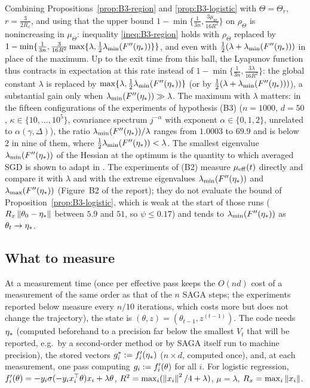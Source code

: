 Combining Propositions~\ref{prop:B3-region} and \ref{prop:B3-logistic} with $\Theta=\Theta_r$, $r=\frac{3}{2R_x}$, and using that the upper bound $1-\min\{\frac1{3n},\frac{3\mu_\Theta}{16R^2}\}$ on $\rho_\Theta$ is nonincreasing in $\mu_\Theta$: inequality \eqref{ineq:B3-region} holds with $\rho_\Theta$ replaced by $1-\min\{\frac1{3n},\frac{3}{16R^2}\max\{\lambda,\frac12\lambda_{\min}(F''(\eta_\ast))\}\}$, and even with $\frac12(\lambda+\lambda_{\min}(F''(\eta_\ast)))$ in place of the maximum. Up to the exit time from this ball, the Lyapunov function thus contracts in expectation at this rate instead of $1-\min\{\frac1{3n},\frac{3\lambda}{16R^2}\}$: the global constant $\lambda$ is replaced by $\max\{\lambda,\frac12\lambda_{\min}(F''(\eta_\ast))\}$ (or by $\frac12(\lambda+\lambda_{\min}(F''(\eta_\ast)))$), a substantial gain only when $\lambda_{\min}(F''(\eta_\ast))\gg\lambda$. The maximum with $\lambda$ matters: in the fifteen configurations of the experiments of hypothesis (B3) ($n=1000$, $d=50$, $\kappa\in\{10,\dots,10^5\}$, covariance spectrum $j^{-\alpha}$ with exponent $\alpha\in\{0,1,2\}$, unrelated to $\alpha(\gamma,\Delta)$), the ratio $\lambda_{\min}(F''(\eta_\ast))/\lambda$ ranges from $1.0003$ to $69.9$ and is below $2$ in nine of them, where $\frac12\lambda_{\min}(F''(\eta_\ast))<\lambda$. The smallest eigenvalue $\lambda_{\min}(F''(\eta_\ast))$ of the Hessian at the optimum is the quantity to which averaged SGD is shown to adapt in \cite{bach2014adaptivity}. The experiments of (B2) measure $\mu_{\mathrm{eff}}(t)$ directly and compare it with $\lambda$ and with the extreme eigenvalues $\lambda_{\min}(F''(\eta_\ast))$ and $\lambda_{\max}(F''(\eta_\ast))$ (Figure~B2 of the report); they do not evaluate the bound of Proposition~\ref{prop:B3-logistic}, which is weak at the start of those runs ($R_x\left\|\theta_0-\eta_\ast\right\|$ between $5.9$ and $51$, so $\psi\le0.17$) and tends to $\lambda_{\min}(F''(\eta_\ast))$ as $\theta_t\to\eta_\ast$.

\subsection{What to measure}\label{sec:B3-measure}

At a measurement time (once per effective pass keeps the $O(nd)$ cost of a measurement of the same order as that of the $n$ SAGA steps; the experiments reported below measure every $n/10$ iterations, which costs more but does not change the trajectory), the state is $(\theta,z)=(\theta_{t-1},z^{(t-1)})$. The code needs $\eta_\ast$ (computed beforehand to a precision far below the smallest $V_t$ that will be reported, e.g.\ by a second-order method or by SAGA itself run to machine precision), the stored vectors $g^\ast_i:=f'_i(\eta_\ast)$ ($n\times d$, computed once), and, at each measurement, one pass computing $g_i:=f'_i(\theta)$ for all $i$. For logistic regression, $f'_i(\theta)=-y_i\sigma(-y_ix_i^\top\theta)x_i+\lambda\theta$, $R^2=\max_i(\left\|x_i\right\|^2/4+\lambda)$, $\mu=\lambda$, $R_x=\max_i\left\|x_i\right\|$.

